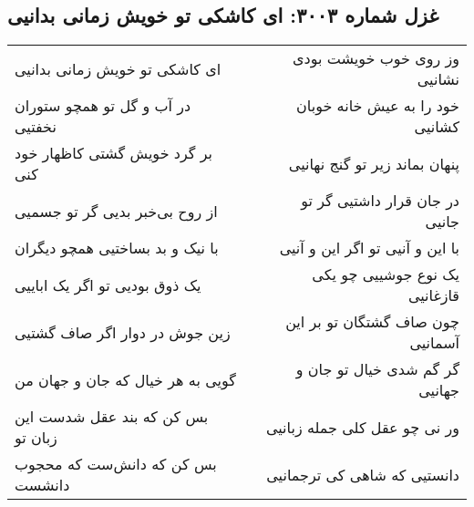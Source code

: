 \begin{center}
\section*{غزل شماره ۳۰۰۳: ای کاشکی تو خویش زمانی بدانیی}
\label{sec:3003}
\begin{longtable}{l p{0.5cm} r}
ای کاشکی تو خویش زمانی بدانیی
&&
وز روی خوب خویشت بودی نشانیی
\\
در آب و گل تو همچو ستوران نخفتیی
&&
خود را به عیش خانه خوبان کشانیی
\\
بر گرد خویش گشتی کاظهار خود کنی
&&
پنهان بماند زیر تو گنج نهانیی
\\
از روح بی‌خبر بدیی گر تو جسمیی
&&
در جان قرار داشتیی گر تو جانیی
\\
با نیک و بد بساختیی همچو دیگران
&&
با این و آنیی تو اگر این و آنیی
\\
یک ذوق بودیی تو اگر یک اباییی
&&
یک نوع جوشییی چو یکی قازغانیی
\\
زین جوش در دوار اگر صاف گشتیی
&&
چون صاف گشتگان تو بر این آسمانیی
\\
گویی به هر خیال که جان و جهان من
&&
گر گم شدی خیال تو جان و جهانیی
\\
بس کن که بند عقل شدست این زبان تو
&&
ور نی چو عقل کلی جمله زبانیی
\\
بس کن که دانش‌ست که محجوب دانشست
&&
دانستیی که شاهی کی ترجمانیی
\\
\end{longtable}
\end{center}
